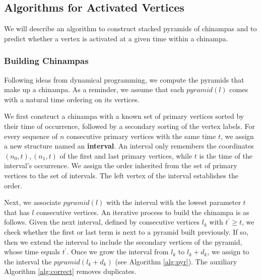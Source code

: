 \documentclass[a4paper]{article}\usepackage[english]{babel}
\theoremstyle{definition}
\newcommand{\apyr}[1][l]{\ensuremath{pyramid(#1)}}
\renewcommand{\emph}[1]{\textbf{#1}}
\begin{document}
\subsection{Algorithms for Activated Vertices}\label{sec:alg}

We will describe an algorithm to construct stacked pyramids of chinampas and to predict whether a vertex is activated at a given time within a chinampa.

\subsubsection*{Building Chinampas}

Following ideas from dynamical programming, we compute the pyramids that make up a chinampa. As a reminder, we assume that each $\apyr$ comes with a natural time ordering on its vertices.

We first construct a chinampa with a known set of primary vertices sorted by their time of occurrence, followed by a secondary sorting of the vertex labels. For every sequence of $n$ consecutive primary vertices with the same time $t$, we assign a new structure named an \emph{interval}. An interval only remembers the coordinates $(n_0,t), (n_1,t)$ of the first and last primary vertices, while $t$ is the time of the interval's occurrence. We assign the order inherited from the set of primary vertices to the set of intervals. The left vertex of the interval establishes the order.

Next, we associate $\apyr$ with the interval with the lowest parameter $t$ that has $l$ consecutive vertices. An iterative process to build the chinampa is as follows. Given the next interval, defined by consecutive vertices $l_k$ with $t^\prime\geq t$, we check whether the first or last term is next to a pyramid built previously. If so, then we extend the interval to include the secondary vertices of the pyramid, whose time equals $t^\prime$. Once we grow the interval from $l_k$ to $l_k+d_k$, we assign to the interval the $\apyr[l_k+d_k]$ (see Algorithm \ref{alg:pyr}). The auxiliary Algorithm \ref{alg:correct} removes duplicates.
\newpage
\end{document}
